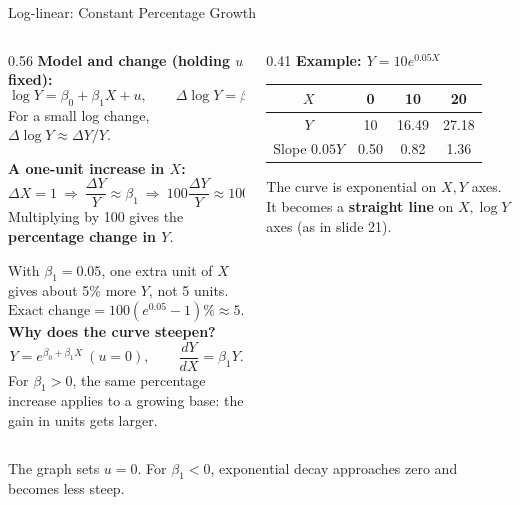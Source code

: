 \documentclass[notes,10pt, aspectratio=169]{beamer}
\begin{document}
\begin{frame}{Log-linear: Constant Percentage Growth}
\small
\setlength{\abovedisplayskip}{4pt}
\setlength{\belowdisplayskip}{4pt}
\setlength{\abovedisplayshortskip}{2pt}
\setlength{\belowdisplayshortskip}{2pt}
\begin{columns}[T]
\begin{column}{0.56\textwidth}
\textbf{Model and change (holding $u$ fixed):}
\[
\log Y=\beta_0+\beta_1X+u,
\qquad \Delta\log Y=\beta_1\Delta X.
\]
For a small log change, $\Delta\log Y\approx\Delta Y/Y$.
\vspace{3pt}

\textbf{A one-unit increase in $X$:}
\[
\Delta X=1
\ \Rightarrow\ \frac{\Delta Y}{Y}\approx\beta_1
\ \Rightarrow\ 100\frac{\Delta Y}{Y}\approx100\beta_1.
\]
Multiplying by 100 gives the \textbf{percentage change in $Y$}.
\vspace{3pt}

With $\beta_1=0.05$, one extra unit of $X$ gives about 5\% more $Y$, not 5 units.
\[
\text{Exact change}=100(e^{0.05}-1)\%\approx5.13\%.
\]
\textbf{Why does the curve steepen?}
\[
Y=e^{\beta_0+\beta_1X}\ (u=0),
\qquad\boxed{\frac{dY}{dX}=\beta_1Y.}
\]
For $\beta_1>0$, the same percentage increase applies to a growing base: the gain in units gets larger.
\end{column}
\begin{column}{0.41\textwidth}
\centering
\textbf{Example: $Y=10e^{0.05X}$}


\vspace{3pt}
\begin{tabular}{c|ccc}
$X$ & 0 & 10 & 20\\
\hline
$Y$ & 10 & 16.49 & 27.18\\
Slope $0.05Y$ & 0.50 & 0.82 & 1.36
\end{tabular}
\vspace{3pt}

\raggedright
The curve is exponential on $X,Y$ axes. It becomes a \textbf{straight line} on $X,\log Y$ axes (as in slide 21).
\end{column}
\end{columns}
\vspace{3pt}
{\scriptsize The graph sets $u=0$. For $\beta_1<0$, exponential decay approaches zero and becomes less steep.}
\end{frame}
\end{document}
